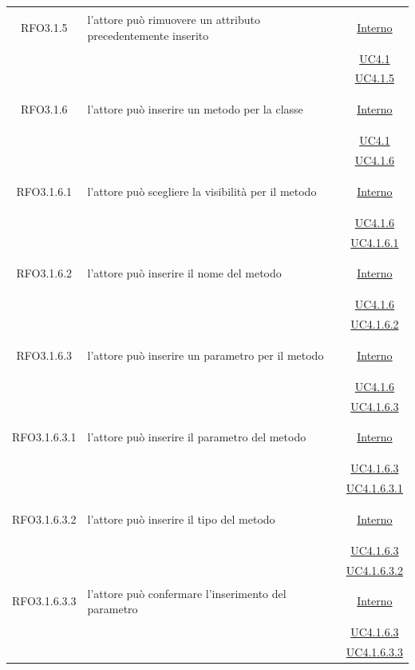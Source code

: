 \begin{longtable}{|c|>{\centering}m{7cm}|c|}
\hypertarget{RFO3.1.5}{RFO3.1.5} & l'attore può rimuovere un attributo precedentemente inserito & \hyperlink{Interno}{Interno}\\
& &\hyperref[UC4.1]{UC4.1}\\
& &\hyperref[UC4.1.5]{UC4.1.5}\\ \hline

\hypertarget{RFO3.1.6}{RFO3.1.6} & l'attore può inserire un metodo per la classe &\hyperlink{Interno}{Interno}\\
& &\hyperref[UC4.1]{UC4.1}\\
& &\hyperref[UC4.1.6]{UC4.1.6}\\ \hline

\hypertarget{RFO3.1.6.1}{RFO3.1.6.1} & l'attore può scegliere la visibilità per il metodo &\hyperlink{Interno}{Interno}\\
& &\hyperref[UC4.1.6]{UC4.1.6}\\
& &\hyperref[UC4.1.6.1]{UC4.1.6.1}\\ \hline

\hypertarget{RFO3.1.6.2}{RFO3.1.6.2} & l'attore può inserire il nome del metodo & \hyperlink{Interno}{Interno}\\
& &\hyperref[UC4.1.6]{UC4.1.6}\\
& &\hyperref[UC4.1.6.2]{UC4.1.6.2}\\ \hline

\hypertarget{RFO3.1.6.3}{RFO3.1.6.3} & l'attore può inserire un parametro per il metodo & \hyperlink{Interno}{Interno}\\
& &\hyperref[UC4.1.6]{UC4.1.6}\\
& &\hyperref[UC4.1.6.3]{UC4.1.6.3}\\ \hline

\hypertarget{RFO3.1.6.3.1}{RFO3.1.6.3.1} & l'attore può inserire il parametro del metodo &\hyperlink{Interno}{Interno}\\
& & \hyperref[UC4.1.6.3]{UC4.1.6.3}\\
& & \hyperref[UC4.1.6.3.1]{UC4.1.6.3.1}\\ \hline

\hypertarget{RFO3.1.6.3.2}{RFO3.1.6.3.2} & l'attore può inserire il tipo del metodo &\hyperlink{Interno}{Interno}\\
& &\hyperref[UC4.1.6.3]{UC4.1.6.3}\\
& &\hyperref[UC4.1.6.3.2]{UC4.1.6.3.2}\\ \hline

\hypertarget{RFO3.1.6.3.3}{RFO3.1.6.3.3} & l'attore può confermare l'inserimento del parametro & \hyperlink{Interno}{Interno}\\
& &\hyperref[UC4.1.6.3]{UC4.1.6.3}\\
& &\hyperref[UC4.1.6.3.3]{UC4.1.6.3.3}\\ \hline


\end{longtable}
